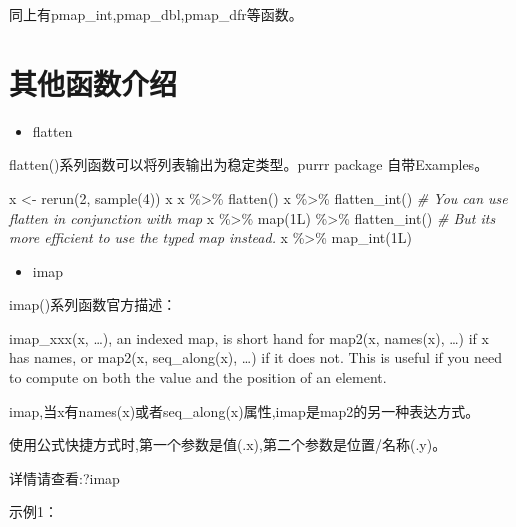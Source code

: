 \documentclass[
]{book}
\newenvironment{Shaded}{\begin{snugshade}}{\end{snugshade}}
\newcommand{\CommentTok}[1]{\textcolor[rgb]{0.56,0.35,0.01}{\textit{#1}}}
\newcommand{\DecValTok}[1]{\textcolor[rgb]{0.00,0.00,0.81}{#1}}
\newcommand{\FunctionTok}[1]{\textcolor[rgb]{0.00,0.00,0.00}{#1}}
\newcommand{\NormalTok}[1]{#1}
\newcommand{\OtherTok}[1]{\textcolor[rgb]{0.56,0.35,0.01}{#1}}
\newcommand{\SpecialCharTok}[1]{\textcolor[rgb]{0.00,0.00,0.00}{#1}}
\providecommand{\tightlist}{%
  \setlength{\itemsep}{0pt}\setlength{\parskip}{0pt}}
\begin{document}
同上有pmap\_int,pmap\_dbl,pmap\_dfr等函数。

\hypertarget{ux5176ux4ed6ux51fdux6570ux4ecbux7ecd}{%
\section{其他函数介绍}\label{ux5176ux4ed6ux51fdux6570ux4ecbux7ecd}}

\begin{itemize}
\tightlist
\item
  flatten
\end{itemize}

flatten()系列函数可以将列表输出为稳定类型。purrr package 自带Examples。

\begin{Shaded}
\begin{Highlighting}[]
\NormalTok{x }\OtherTok{\textless{}{-}} \FunctionTok{rerun}\NormalTok{(}\DecValTok{2}\NormalTok{, }\FunctionTok{sample}\NormalTok{(}\DecValTok{4}\NormalTok{))}
\NormalTok{x}
\NormalTok{x }\SpecialCharTok{\%\textgreater{}\%} \FunctionTok{flatten}\NormalTok{()}
\NormalTok{x }\SpecialCharTok{\%\textgreater{}\%} \FunctionTok{flatten\_int}\NormalTok{()}
\CommentTok{\# You can use flatten in conjunction with map}
\NormalTok{x }\SpecialCharTok{\%\textgreater{}\%} \FunctionTok{map}\NormalTok{(1L) }\SpecialCharTok{\%\textgreater{}\%} \FunctionTok{flatten\_int}\NormalTok{()}
\CommentTok{\# But it\textquotesingle{}s more efficient to use the typed map instead.}
\NormalTok{x }\SpecialCharTok{\%\textgreater{}\%} \FunctionTok{map\_int}\NormalTok{(1L)}
\end{Highlighting}
\end{Shaded}

\begin{itemize}
\tightlist
\item
  imap
\end{itemize}

imap()系列函数官方描述：

imap\_xxx(x, \ldots), an indexed map, is short hand for map2(x, names(x), \ldots) if x has names, or map2(x, seq\_along(x), \ldots) if it does not. This is useful if you need to compute on both the value and the position of an element.

imap,当x有names(x)或者seq\_along(x)属性,imap是map2的另一种表达方式。

使用公式快捷方式时,第一个参数是值(.x),第二个参数是位置/名称(.y)。

详情请查看:?imap

示例1：
\end{document}

